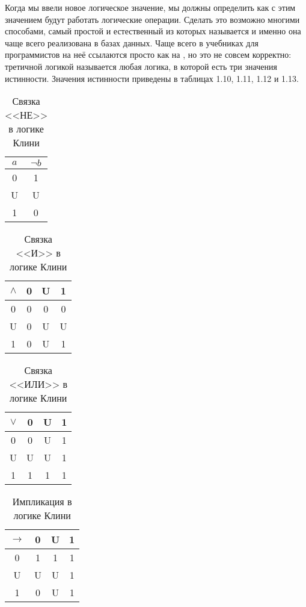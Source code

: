 Когда мы ввели новое логическое значение, мы должны определить как с этим значением будут работать логические операции. Сделать это возможно многими способами, самый простой и естественный из которых называется  и именно она чаще всего реализована в базах данных. Чаще всего в учебниках для программистов на неё ссылаются просто как на , но это не совсем корректно: третичной логикой называется любая логика, в которой есть три значения истинности. Значения истинности приведены в таблицах 1.10, 1.11, 1.12 и 1.13.

\begin{table}[h]
\centering
\begin{tabular}{c | c}
$a$ & $\neg b$ \\
\hline
0 & 1 \\
U & U\\
1 & 0
\end{tabular}
\caption{Связка <<НЕ>> в логике Клини}\label{table:kleene-not}
\end{table}

\begin{table}[h]
\centering
\begin{tabular}{c | c c c}
$\land$ & 0 &U &1 \\
\hline
0 & 0 & 0 & 0 \\
U & 0 & U & U\\
1 & 0 & U & 1
\end{tabular}
\caption{Связка <<И>> в логике Клини}\label{table:kleene-and}
\end{table}

\begin{table}[h]
\centering
\begin{tabular}{c | c c c}
$\lor$ & 0 &U &1 \\
\hline
0 & 0 & U & 1 \\
U & U & U & 1\\
1 & 1 & 1 & 1
\end{tabular}
\caption{Связка <<ИЛИ>> в логике Клини}\label{table:kleene-or}
\end{table}

\begin{table}[h]
\centering
\begin{tabular}{c | c c c}
$\to$ & 0& U& 1 \\
\hline
0 & 1 & 1 & 1 \\
U & U & U & 1\\
1 & 0 & U & 1
\end{tabular}
\caption{Импликация в логике Клини}\label{table:kleene-or}
\end{table}

